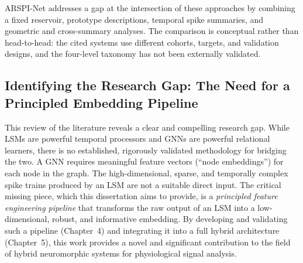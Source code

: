 ARSPI-Net addresses a gap at the intersection of these approaches by combining a fixed reservoir, prototype descriptions, temporal spike summaries, and geometric and cross-summary analyses. The comparison is conceptual rather than head-to-head: the cited systems use different cohorts, targets, and validation designs, and the four-level taxonomy has not been externally validated.

\subsection{Identifying the Research Gap: The Need for a Principled Embedding Pipeline}
\label{sec:research_gap}
This review of the literature reveals a clear and compelling research gap. While LSMs are powerful temporal processors and GNNs are powerful relational learners, there is no established, rigorously validated methodology for bridging the two. A GNN requires meaningful feature vectors (``node embeddings'') for each node in the graph. The high-dimensional, sparse, and temporally complex spike trains produced by an LSM are not a suitable direct input. The critical missing piece, which this dissertation aims to provide, is a \emph{principled feature engineering pipeline} that transforms the raw output of an LSM into a low-dimensional, robust, and informative embedding. By developing and validating such a pipeline (Chapter~4) and integrating it into a full hybrid architecture (Chapter~5), this work provides a novel and significant contribution to the field of hybrid neuromorphic systems for physiological signal analysis.
